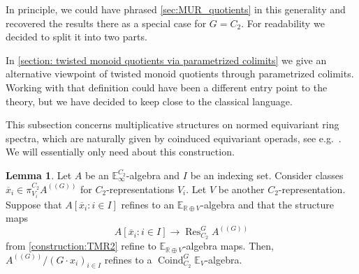 \documentclass[a4paper, 10pt]{article}
\newcommand{\E}{\mathbb E}  %
\newcommand{\R}{\mathbb R}
\newcommand{\Res}{\operatorname{Res}}
\newcommand{\Coind}{\operatorname{Coind}}
\newcommand{\ol}{\overline}
\theoremstyle{definition}
\newtheorem{lemma}[lemma]{Lemma}
\begin{document}
In principle, we could have phrased \cref{sec:MUR_quotients} in this generality and recovered the results there as a special case for $G = C_2$. For readability we decided to split it into two parts. 

In \cref{section: twisted monoid quotients via parametrized colimits} we give an alternative viewpoint of twisted monoid quotients through parametrized colimits. Working with that definition could have been a different entry point to the theory, but we have decided to keep close to the classical language.

This subsection concerns multiplicative structures on normed equivariant ring spectra, which are naturally given by coinduced equivariant operads, see e.g.~\cite[Construction 2.2.5]{quinnZhu2026multiplicativeequivariantthomspectra}. We will essentially only need \cite[Construction 2.2.5, Corollary 6.1.6]{quinnZhu2026multiplicativeequivariantthomspectra} about this construction.

\begin{lemma} \label{lemma: enhance structure of twisted monoid quotients}
    Let $A$ be an $\E_{\infty}^{C_2}$-algebra and $I$ be an indexing set. Consider classes $\ol{x}_i \in \pi_{V_i}^{C_2} A^{( \! ( G ) \! )}$ for $C_2$-representations $V_i$. Let $V$ be another $C_2$-representation. Suppose that $A[\ol{x}_i : i \in I]$ refines to an $\E_{\R \oplus V}$-algebra and that the structure maps 
    \[ A[\ol{x}_i : i \in I] \longrightarrow \Res_{C_2}^G A^{( \! ( G ) \! )} \] from \cref{construction:TMR2} refine to $\E_{\R \oplus V}$-algebra maps.
    Then, $A^{( \! ( G ) \! )}/(G \cdot x_i)_{i \in I}$ refines to a $\Coind_{C_2}^G\E_V$-algebra.
\end{lemma}
\end{document}
